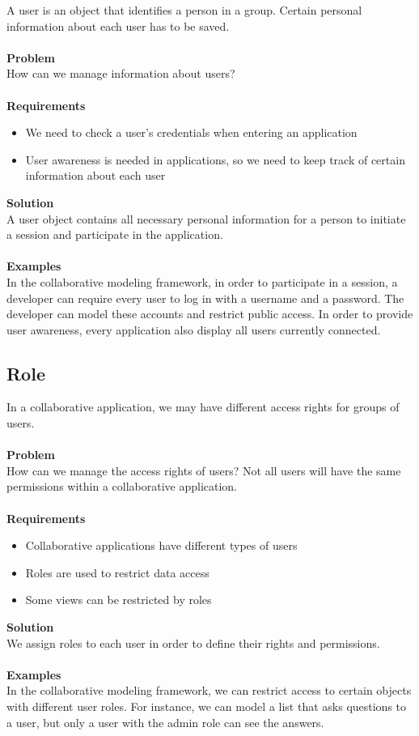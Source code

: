 A user is an object that identifies a person in a group. Certain personal information about each user has to be saved. 
\\ \\
\textbf{Problem}
\\
How can we manage information about users?
\\ \\
\textbf{Requirements}
\begin{itemize}
\item{We need to check a user's credentials when entering an application}
\item{User awareness is needed in applications, so we need to keep track of certain information about each user}
\end{itemize}
\textbf{Solution}
\\
A user object contains all necessary personal information for a person to initiate a session and participate in the application.
\\ \\
\textbf{Examples}
\\
In the collaborative modeling framework, in order to participate in a session, a developer can require every user to log in with a username and a password. The developer can model these accounts and restrict public access. In order to provide user awareness, every application also display all users currently connected.

\subsection{Role}

In a collaborative application, we may have different access rights for groups of users.
\\ \\
\textbf{Problem}
\\
How can we manage the access rights of users? Not all users will have the same permissions within a collaborative application.
\\ \\
\textbf{Requirements}
\begin{itemize}
\item{Collaborative applications have different types of users}
\item{Roles are used to restrict data access}
\item{Some views can be restricted by roles}
\end{itemize}
\textbf{Solution}
\\
We assign roles to each user in order to define their rights and permissions.
\\ \\
\textbf{Examples}
\\
In the collaborative modeling framework, we can restrict access to certain objects with different user roles. For instance, we can model a list that asks questions to a user, but only a user with the admin role can see the answers. 

